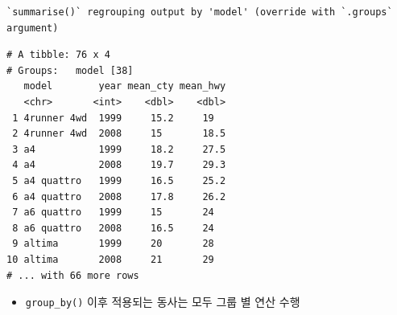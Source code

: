 \documentclass[
  11pt,
]{krantz}
\newenvironment{Shaded}{\begin{snugshade}}{\end{snugshade}}
\newcommand{\CommentTok}[1]{\textcolor[rgb]{0.37,0.37,0.37}{\textit{#1}}}
\newcommand{\DataTypeTok}[1]{\textcolor[rgb]{0.27,0.27,0.27}{#1}}
\newcommand{\KeywordTok}[1]{\textcolor[rgb]{0.27,0.27,0.27}{\textbf{#1}}}
\newcommand{\NormalTok}[1]{#1}
\newcommand{\OperatorTok}[1]{\textcolor[rgb]{0.43,0.43,0.43}{\textbf{#1}}}
\newcommand{\StringTok}[1]{\textcolor[rgb]{0.5,0.5,0.5}{#1}}
\providecommand{\tightlist}{%
  \setlength{\itemsep}{0pt}\setlength{\parskip}{0pt}}
\begin{document}
\begin{Shaded}
\end{Shaded}

\begin{verbatim}
`summarise()` regrouping output by 'model' (override with `.groups` argument)
\end{verbatim}

\begin{verbatim}
# A tibble: 76 x 4
# Groups:   model [38]
   model        year mean_cty mean_hwy
   <chr>       <int>    <dbl>    <dbl>
 1 4runner 4wd  1999     15.2     19  
 2 4runner 4wd  2008     15       18.5
 3 a4           1999     18.2     27.5
 4 a4           2008     19.7     29.3
 5 a4 quattro   1999     16.5     25.2
 6 a4 quattro   2008     17.8     26.2
 7 a6 quattro   1999     15       24  
 8 a6 quattro   2008     16.5     24  
 9 altima       1999     20       28  
10 altima       2008     21       29  
# ... with 66 more rows
\end{verbatim}

\normalsize

\footnotesize

\begin{Shaded}
\end{Shaded}

\normalsize

\begin{itemize}
\tightlist
\item
  \texttt{group\_by()} 이후 적용되는 동사는 모두 그룹 별 연산 수행
\end{itemize}
\end{document}
